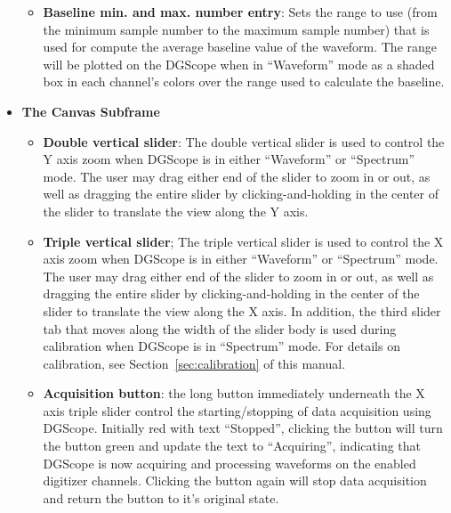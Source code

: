 \begin{itemize}
{\begin{itemize}
{        will cause a global (all 8 channel) trigger-data acquisition
        cycle of the V1720 board when DGScope triggering is set to run
        in ``automatic'' mode.}
      \item{\textbf{Baseline min. and max. number entry}: Sets the
        range to use (from the minimum sample number to the maximum
        sample number) that is used for compute the average baseline
        value of the waveform. The range will be plotted on the
        DGScope when in ``Waveform'' mode as a shaded box in each
        channel's colors over the range used to calculate the
        baseline.}
    \end{itemize}
  }
  \item{\textbf{The Canvas Subframe}
    \begin{itemize}
      \item{\textbf{Double vertical slider}: The double vertical
        slider is used to control the Y axis zoom when DGScope is in
        either ``Waveform'' or ``Spectrum'' mode. The user may drag
        either end of the slider to zoom in or out, as well as
        dragging the entire slider by clicking-and-holding in the
        center of the slider to translate the view along the Y axis.}
      \item{\textbf{Triple vertical slider}; The triple vertical
        slider is used to control the X axis zoom when DGScope is in
        either ``Waveform'' or ``Spectrum'' mode. The user may drag
        either end of the slider to zoom in or out, as well as
        dragging the entire slider by clicking-and-holding in the
        center of the slider to translate the view along the X
        axis. In addition, the third slider tab that moves along the
        width of the slider body is used during calibration when
        DGScope is in ``Spectrum'' mode. For details on calibration,
        see Section~\ref{sec:calibration} of this manual.}
      \item{\textbf{Acquisition button}: the long button immediately
        underneath the X axis triple slider control the
        starting/stopping of data acquisition using DGScope. Initially
        red with text ``Stopped'', clicking the button will turn the
        button green and update the text to ``Acquiring'', indicating
        that DGScope is now acquiring and processing waveforms on the
        enabled digitizer channels. Clicking the button again will
        stop data acquisition and return the button to it's original
        state.}
    \end{itemize}
}
\end{itemize}

